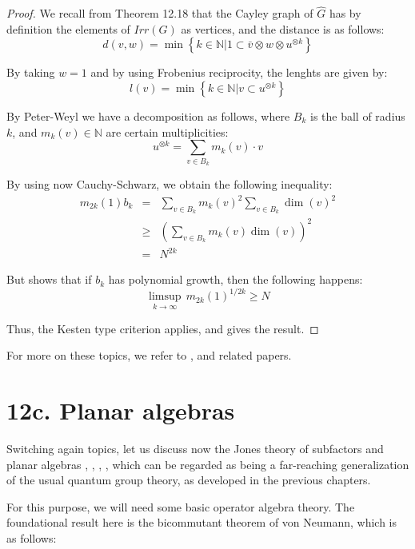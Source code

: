 \documentclass[12pt]{amsbook}
\begin{document}
\begin{proof}
We recall from Theorem 12.18 that the Cayley graph of $\widehat{G}$ has by definition the elements of $Irr(G)$ as vertices, and the distance is as follows:
$$d(v,w)=\min\left\{k\in\mathbb N\Big|1\subset\bar{v}\otimes w\otimes u^{\otimes k}\right\}$$

By taking $w=1$ and by using Frobenius reciprocity, the lenghts are given by:
$$l(v)=\min\left\{k\in\mathbb N\Big|v\subset u^{\otimes k}\right\}$$

By Peter-Weyl we have a decomposition as follows, where $B_k$ is the ball of radius $k$, and $m_k(v)\in\mathbb N$ are certain multiplicities:
$$u^{\otimes k}=\sum_{v\in B_k}m_k(v)\cdot v$$

By using now Cauchy-Schwarz, we obtain the following inequality:
\begin{eqnarray*}
m_{2k}(1)b_k
&=&\sum_{v\in B_k}m_k(v)^2\sum_{v\in B_k}\dim(v)^2\\
&\geq&\left(\sum_{v\in B_k}m_k(v)\dim(v)\right)^2\\
&=&N^{2k}
\end{eqnarray*}

But shows that if $b_k$ has polynomial growth, then the following happens:
$$\limsup_{k\to\infty}\, m_{2k}(1)^{1/2k}\geq N$$

Thus, the Kesten type criterion applies, and gives the result.
\end{proof}

For more on these topics, we refer to \cite{cdp}, \cite{dpr} and related papers.

\section*{12c. Planar algebras}

Switching again topics, let us discuss now the Jones theory of subfactors and planar algebras \cite{jo1}, \cite{jo2}, \cite{jo3}, \cite{jo4}, which can be regarded as being a far-reaching generalization of the usual quantum group theory, as developed in the previous chapters.

\bigskip

For this purpose, we will need some basic operator algebra theory. The foundational result here is the bicommutant theorem of von Neumann, which is as follows:

\end{document}
